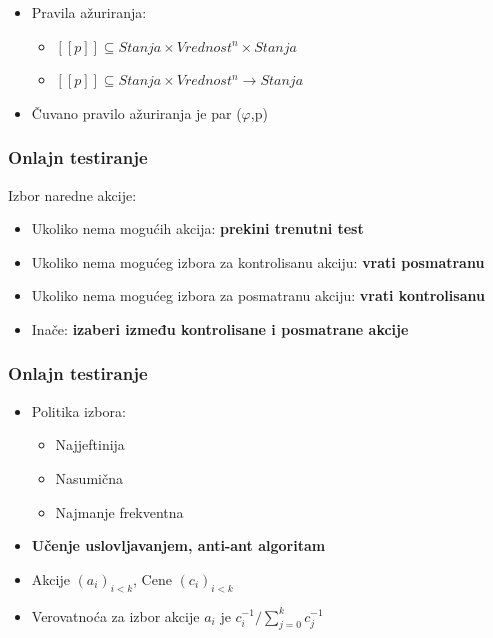 \documentclass[11pt]{beamer}
\theoremstyle{definition}
\begin{document}
{\begin{frame}
\begin{itemize}
\item Pravila ažuriranja:
\begin{itemize}
	\item $[[p]] \subseteq Stanja \times Vrednost^n \times Stanja$
	\item $[[p]] \subseteq Stanja \times Vrednost^n \rightarrow Stanja$
\end{itemize}

\item Čuvano pravilo ažuriranja je par ($\varphi$,p) 
\end{itemize}
\end{frame}


\begin{frame}
\frametitle{Onlajn testiranje}

Izbor naredne akcije:
\begin {itemize}
	\item Ukoliko nema mogućih akcija: \newline \textbf{prekini trenutni test}
	\item Ukoliko nema mogućeg izbora za kontrolisanu akciju: \newline \textbf{vrati posmatranu}
	\item Ukoliko nema mogućeg izbora za posmatranu akciju: \newline \textbf{vrati kontrolisanu}
	\item Inače: \newline \textbf{izaberi između kontrolisane i posmatrane akcije}
\end {itemize}

\end{frame}



\begin{frame}
\frametitle{Onlajn testiranje}

\begin{itemize}
\item Politika izbora:
\begin{itemize}
	\item Najjeftinija
	\item Nasumična
	\item Najmanje frekventna
\end{itemize}
\item \textbf{Učenje uslovljavanjem, anti-ant algoritam}
\item Akcije $(a_i)_{i < k}$, Cene $(c_i)_{i < k}$
\item Verovatnoća za izbor akcije $a_i$ je $c_i^{-1} / \sum_{j=0}^{k} c_j^{-1}$
\end{itemize}
\end{frame}

}
\end{document}
